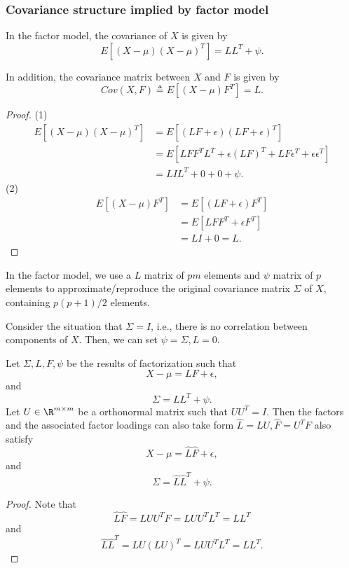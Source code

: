 \begin{refsection}
\subsubsection{Covariance structure implied by factor model}
\begin{lemma}\cite[483]{johnson2007applied}
In the factor model, the covariance of $X$  is given by
$$E[(X-\mu)(X-\mu)^T] = LL^T + \psi.$$	

In addition, the covariance matrix between $X$ and $F$ is given by
$$Cov(X,F) \triangleq E[(X - \mu)F^T] = L.$$
\end{lemma}
\begin{proof}
(1)	
\begin{align*}
E[(X-\mu)(X-\mu)^T] &= E[(LF + \epsilon)(LF + \epsilon)^T] \\
&=E[LFF^TL^T + \epsilon (LF)^T + LF\epsilon^T + \epsilon \epsilon^T] \\
&= LIL^T + 0 + 0 + \psi. 
\end{align*}	
(2)
\begin{align*}
E[(X-\mu)F^T] &= E[(LF + \epsilon)F^T] \\
&=E[LFF^T + \epsilon F^T] \\
&= LI + 0 = L. 
\end{align*}
\end{proof}


\begin{remark}
In the factor model, we use a $L$ matrix of $pm$ elements and $\psi$ matrix of $p$ elements to approximate/reproduce the original covariance matrix $\Sigma$ of $X$, containing $p(p+1)/2$ elements. 	
\end{remark}

\begin{remark}[$L = 0$ if there is no correlation between components of $X$]
Consider the situation that $\Sigma = I$, i.e., there is no correlation between components of $X$. Then, we can set $\psi = \Sigma, L = 0$.	
\end{remark}

\begin{lemma}\cite[573]{anderson2009introduction}\cite[488,504]{johnson2007applied}
Let $\Sigma, L,F, \psi$ be the results of factorization such that
$$X-\mu = LF + \epsilon,$$
and
$$\Sigma = LL^T + \psi. $$
Let $U \in \R^{m\times m}$ be a orthonormal matrix such that $UU^T = I$. Then the factors and the associated factor loadings can also take form 
$\hat{L} = LU, \hat{F} = U^TF$ also satisfy
$$X-\mu = \hat{L}\hat{F} + \epsilon,$$
and
 	$$\Sigma = \hat{L}\hat{L}^T + \psi. $$
\end{lemma}
\begin{proof}
Note that	
$$\hat{L}\hat{F} = LUU^TF = LUU^TL^T = LL^T$$
and
$$\hat{L}\hat{L}^T = LU(LU)^T = LUU^TL^T = LL^T.$$	
\end{proof}


\end{refsection}
